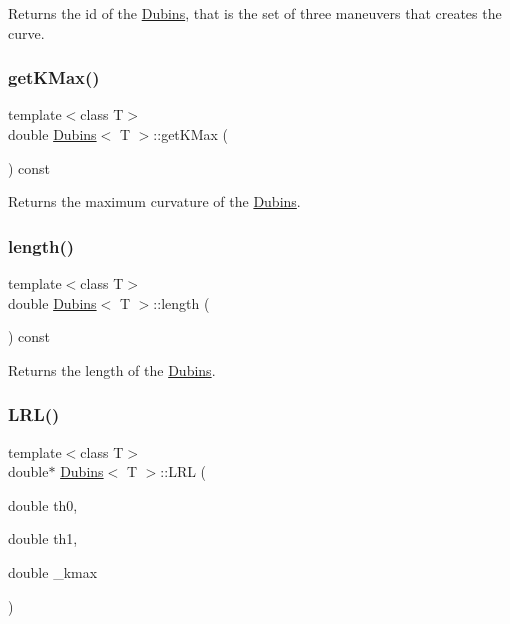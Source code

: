 Returns the id of the \mbox{\hyperlink{class_dubins}{Dubins}}, that is the set of three maneuvers that creates the curve. 

\mbox{\label{class_dubins_a5e9a9f09ceed8f592fd35d078090854e}} 
\subsubsection{\texorpdfstring{getKMax()}{getKMax()}}
{\footnotesize\ttfamily template$<$class T$>$ \\
double \mbox{\hyperlink{class_dubins}{Dubins}}$<$ T $>$\+::get\+K\+Max (\begin{DoxyParamCaption}{ }\end{DoxyParamCaption}) const\hspace{0.3cm}{\ttfamily [inline]}}



Returns the maximum curvature of the \mbox{\hyperlink{class_dubins}{Dubins}}. 

\mbox{\label{class_dubins_ae4978fe0667d364224c0a7521903a225}} 
\subsubsection{\texorpdfstring{length()}{length()}}
{\footnotesize\ttfamily template$<$class T$>$ \\
double \mbox{\hyperlink{class_dubins}{Dubins}}$<$ T $>$\+::length (\begin{DoxyParamCaption}{ }\end{DoxyParamCaption}) const\hspace{0.3cm}{\ttfamily [inline]}}



Returns the length of the \mbox{\hyperlink{class_dubins}{Dubins}}. 

\mbox{\label{class_dubins_a1e1503925ef99b85b208f96fb27c88f9}} 
\subsubsection{\texorpdfstring{LRL()}{LRL()}}
{\footnotesize\ttfamily template$<$class T$>$ \\
double$\ast$ \mbox{\hyperlink{class_dubins}{Dubins}}$<$ T $>$\+::L\+RL (\begin{DoxyParamCaption}\item[{double}]{th0,  }\item[{double}]{th1,  }\item[{double}]{\+\_\+kmax }\end{DoxyParamCaption})\hspace{0.3cm}{\ttfamily [inline]}}

